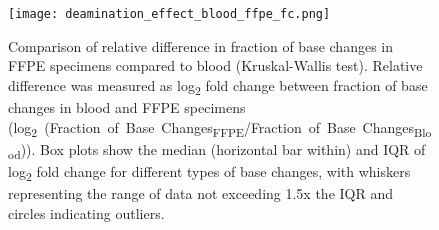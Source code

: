 
\begin{figure}[H]
	\centering
	\texttt{[image: deamination\_effect\_blood\_ffpe\_fc.png]}
	\caption[Comparison of relative difference in fraction of base changes in FFPE specimens compared to blood (Kruskal-Wallis test).]{Comparison of relative difference in fraction of base changes in FFPE specimens compared to blood (Kruskal-Wallis test). Relative difference was measured as log\textsubscript{2} fold change between fraction of base changes in blood and FFPE specimens \mbox{(log\textsubscript{2} (Fraction of Base Changes\textsubscript{FFPE}/Fraction of Base Changes\textsubscript{Blood}))}. Box plots show the median (horizontal bar within) and IQR of log\textsubscript{2} fold change for different types of base changes, with whiskers representing the range of data not exceeding 1.5x the IQR and circles indicating outliers.}
	\label{fig:deamination_effect_blood_ffpe_fc}
\end{figure}


